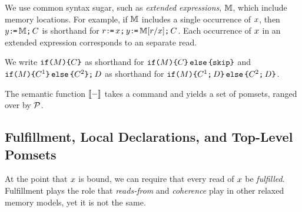 We use common syntax sugar, such as \emph{extended expressions}, $\aEExp$,
which include memory locations.  For example, if $\aEExp$ includes a single
occurrence of $\aLoc$, then $\bLoc\GETS\aEExp\SEMI \aCmd$ is shorthand for
$\aReg\GETS\aLoc\SEMI\bLoc\GETS\aEExp[\aReg/\aLoc]\SEMI \aCmd$.  Each
occurrence of $\aLoc$ in an extended expression corresponds to an separate
read.

We write
$\IF{\aExp} \THEN \aCmd \FI$ as shorthand for
$\IF{\aExp} \THEN \aCmd\ELSE \SKIP\FI$ and
$\IF{\aExp} \THEN \aCmd^1 \ELSE \aCmd^2 \FI \SEMI \bCmd$ as shorthand for
$\IF{\aExp} \THEN \aCmd^1 \SEMI \bCmd\ELSE \aCmd^2 \SEMI \bCmd\FI$.

The semantic function $\sem[\aThrd]{-}$ takes a command and
yields a set of pomsets, ranged over by $\aPSS$.





\subsection{Fulfillment, Local Declarations, and Top-Level Pomsets}
At the point that $\aLoc$ is bound, we can require that every read of $\aLoc$
be \emph{fulfilled}.  Fulfillment plays the role that \emph{reads-from} and
\emph{coherence} play in other relaxed memory models, yet it is not the same.

